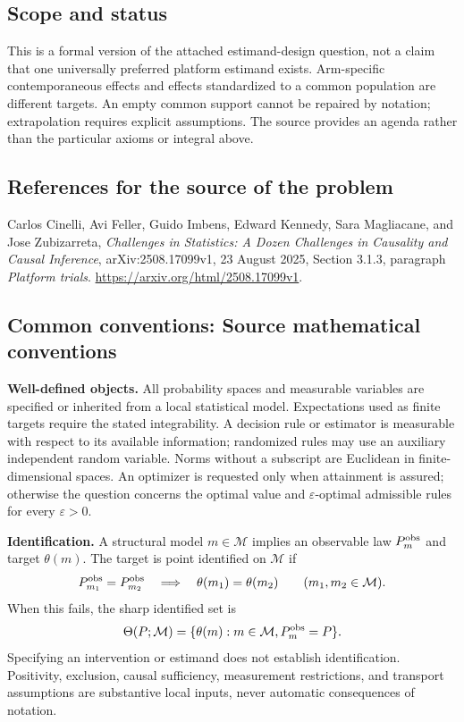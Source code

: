 \documentclass[11pt,a4paper]{article}
\begin{document}
\subsection*{Scope and status}
This is a formal version of the attached estimand-design question, not a claim that one universally preferred platform estimand exists. Arm-specific contemporaneous effects and effects standardized to a common population are different targets. An empty common support cannot be repaired by notation; extrapolation requires explicit assumptions. The source provides an agenda rather than the particular axioms or integral above.
\subsection*{References for the source of the problem}
Carlos Cinelli, Avi Feller, Guido Imbens, Edward Kennedy, Sara Magliacane, and Jose Zubizarreta, \emph{Challenges in Statistics: A Dozen Challenges in Causality and Causal Inference}, arXiv:2508.17099v1, 23 August 2025, Section 3.1.3, paragraph \emph{Platform trials}. \url{https://arxiv.org/html/2508.17099v1}.

\subsection*{Common conventions: Source mathematical conventions}

\textbf{Well-defined objects.}
All probability spaces and measurable variables are specified or inherited
from a local statistical model. Expectations used as finite targets require
the stated integrability. A decision rule or estimator is measurable with
respect to its available information; randomized rules may use an auxiliary
independent random variable. Norms without a subscript are Euclidean in
finite-dimensional spaces. An optimizer is requested only when attainment
is assured; otherwise the question concerns the optimal value and
$\varepsilon$-optimal admissible rules for every $\varepsilon>0$.

\textbf{Identification.}
A structural model $m\in\mathcal M$ implies an observable law
$P_m^{\rm obs}$ and target $\theta(m)$. The target is point identified on
$\mathcal M$ if
\[
 P_{m_1}^{\rm obs}=P_{m_2}^{\rm obs}
 \quad\Longrightarrow\quad\theta(m_1)=\theta(m_2)
 \qquad(m_1,m_2\in\mathcal M).
\]
When this fails, the sharp identified set is
\[
 \Theta(P;\mathcal M)=\{\theta(m):m\in\mathcal M,
                                  P_m^{\rm obs}=P\}.
\]
Specifying an intervention or estimand does not establish identification.
Positivity, exclusion, causal sufficiency, measurement restrictions, and
transport assumptions are substantive local inputs, never automatic
consequences of notation.
\end{document}
